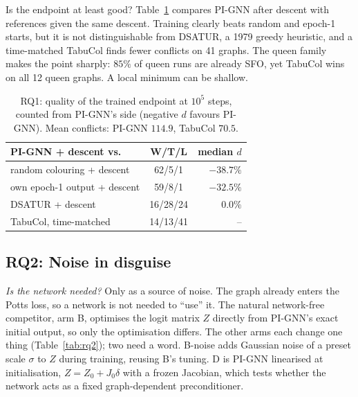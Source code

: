 \documentclass[11pt]{article}
\newcommand{\wtl}[3]{#1/#2/#3}
\begin{document}
Is the endpoint at least good? Table~\ref{tab:rq1} compares PI-GNN after
descent with references given the same descent. Training clearly beats random
and epoch-1 starts, but it is not distinguishable from DSATUR, a 1979 greedy
heuristic, and a time-matched TabuCol finds fewer conflicts on 41 graphs. The
queen family makes the point sharply: $85\%$ of queen runs are already SFO,
yet TabuCol wins on all 12 queen graphs. A local minimum can be shallow.

\begin{table}[t]
\centering\small
\begin{tabular}{@{}lcr@{}}
\toprule
PI-GNN + descent vs.\ & W/T/L & median $d$ \\
\midrule
random colouring + descent & \wtl{62}{5}{1} & $-38.7\%$ \\
own epoch-1 output + descent & \wtl{59}{8}{1} & $-32.5\%$ \\
DSATUR + descent & \wtl{16}{28}{24} & $0.0\%$ \\
TabuCol, time-matched & \wtl{14}{13}{41} & -- \\
\bottomrule
\end{tabular}
\caption{RQ1: quality of the trained endpoint at $10^5$ steps, counted from
PI-GNN's side (negative $d$ favours PI-GNN). Mean conflicts: PI-GNN $114.9$,
TabuCol $70.5$.}
\label{tab:rq1}
\end{table}

\subsection{RQ2: Noise in disguise}

\emph{Is the network needed?} Only as a source of noise. The graph already
enters the Potts loss, so a network is not needed to ``use'' it. The natural
network-free competitor, arm B, optimises the logit matrix $Z$ directly from
PI-GNN's exact initial output, so only the optimisation differs.
The other arms each change one thing (Table~\ref{tab:rq2}); two need a word.
B-noise adds Gaussian noise of a preset scale $\sigma$ to $Z$ during
training, reusing B's tuning. D is PI-GNN linearised at initialisation, $Z=Z_0+J_0\delta$ with a
frozen Jacobian, which tests whether the network acts as a fixed
graph-dependent preconditioner.
\end{document}
